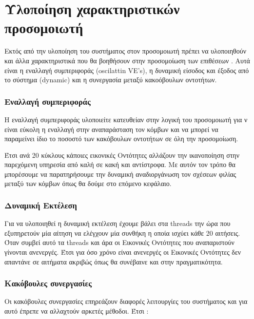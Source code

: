 \section{Υλοποίηση χαρακτηριστικών προσομοιωτή}
Εκτός από την υλοποίηση του συστήματος στον προσομοιωτή πρέπει να υλοποιηθούν και άλλα χαρακτηριστικά που θα βοηθήσουν στην προσομοίωση των επιθέσεων . Αυτά είναι η εναλλαγή συμπεριφοράς (oscilattin VE's), η δυναμική είσοδος και έξοδος από το σύστημα (dynamic) και η συνεργασία μεταξύ κακοόβουλων οντοτήτων.

\subsubsection{Εναλλαγή συμπεριφοράς} 
Η εναλλαγή συμπεριφοράς υλοποιείτε κατευθείαν στην λογική του προσομοιωτή για ν είναι εύκολη η εναλλαγή στην αναπαράσταση τον κόμβων και να μπορεί να παραμείνει ίδιο το ποσοστό των κακόβουλων οντοτήτων σε όλη την προσομοίωση.

 Έτσι ανά 20 κύκλους κάποιες εικονικές Οντότητες αλλάζουν την ικανοποίηση στην παρεχόμενη υπηρεσία από καλή σε κακή και αντίστροφα. Με αυτόν τον τρόπο θα μπορέσουμε να παρατηρήσουμε την δυναμική αναδιοργάνωση τον σχέσεων φιλίας μεταξύ των κόμβων όπως θα δούμε στο επόμενο κεφάλαιο.
 
   
   
 \subsubsection{Δυναμική Εκτέλεση}
 
 Για να υλοποιηθεί η δυναμική εκτέλεση έχουμε βάλει στα threads την ώρα που εξυπηρετούν μία αίτηση να ελέγχουν μία συνθήκη η οποία ισχύει κάθε 20 αιτήσεις. Όταν συμβεί αυτό τα threads και άρα οι Εικονικές Οντότητες που αναπαριστούν γίνονται ανενεργές. Έτσι για όσο χρόνο είναι ανενεργές οι Εικονικές Οντότητες δεν απαντάνε σε αιτήματα ακριβώς όπως θα συνέβαινε και στην πραγματικότητα. 
 


 \subsubsection{Κακόβουλες συνεργασίες}
 
 Οι κακόβουλες συνεργασίες επηρεάζουν διαφορές λειτουργίες του συστήματος και για αυτό έπρεπε να αλλαχτούν αρκετές μέθοδοι. Έτσι :
 
